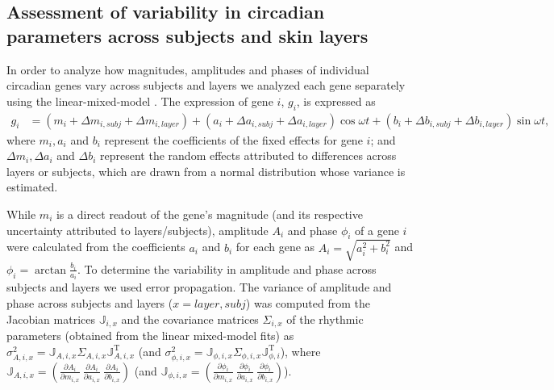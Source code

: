 \subsection*{Assessment of variability in circadian parameters across subjects and skin layers}
In order to analyze how magnitudes, amplitudes and phases of individual circadian genes vary across subjects and layers we analyzed each gene separately using the linear-mixed-model \cite{Bates2015, Laird1982, Hoffman2016}. The expression of gene $i$, $g_i$, is expressed as 
\begin{equation*}
\begin{split}
g_i &= (m_i + \Delta m_{i,subj} + \Delta m_{i,layer}) + (a_i + \Delta a_{i,subj} + \Delta a_{i,layer}) \cos \omega t + (b_i + \Delta b_{i,subj} + \Delta b_{i,layer}) \sin \omega t,
\end{split}
\end{equation*}
where $m_i, a_i$ and $b_i$ represent the coefficients of the fixed effects for gene $i$; and $\Delta m_{i}, \Delta a_{i}$ and $\Delta b_{i}$ represent the random effects attributed to differences across layers or subjects, which are drawn from a normal distribution whose variance is estimated. 

While $m_i$ is a direct readout of the gene's magnitude (and its respective uncertainty attributed to layers/subjects), amplitude $A_i$ and phase $\phi_i$ of a gene $i$ were calculated from the coefficients $a_i$ and $b_i$ for each gene as $A_i=\sqrt{a_i^2 + b_i^2}$ and $\phi_i=\arctan\frac{b_i}{a_i}$. To determine the variability in amplitude and phase across subjects and layers we used error propagation. The variance of amplitude and phase across subjects and layers ($x=layer,subj$) was computed from the Jacobian matrices $\mathbb{J}_{i,x}$ and the covariance matrices $\Sigma_{i,x}$ of the rhythmic parameters (obtained from the linear mixed-model fits) as $\sigma^2_{A,i,x} = \mathbb{J}_{A,i,x} \Sigma_{A,i,x} \mathbb{J}_{A,i,x}^\mathrm{T}$ (and  $\sigma^2_{\phi,i,x} = \mathbb{J}_{\phi,i,x} \Sigma_{\phi,i,x} \mathbb{J}_{\phi,i}^\mathrm{T}$), where $\mathbb{J}_{A,i,x}=\left( \frac{\partial A_i}{\partial m_{i,x}} \  \frac{\partial A_i}{\partial a_{i,x}} \  \frac{\partial A_i}{\partial b_{i,x}} \right)$ (and $\mathbb{J}_{\phi,i,x}=\left( \frac{\partial \phi_i}{\partial m_{i,x}} \  \frac{\partial \phi_i}{\partial a_{i,x}} \  \frac{\partial \phi_i}{\partial b_{i,x}} \right)$).

